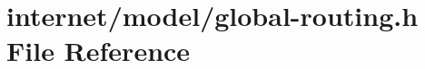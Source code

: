 \hypertarget{global-routing_8h}{}\section{internet/model/global-\/routing.h File Reference}
\label{global-routing_8h}
